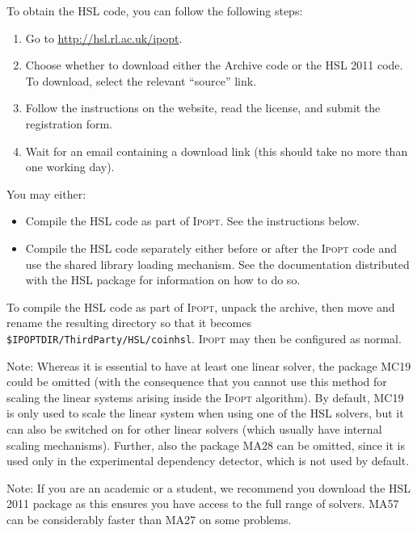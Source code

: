 \documentclass[10pt]{article}
\newcommand{\Ipopt}{\textsc{Ipopt}\xspace}
\begin{document}
To obtain the HSL code, you can follow the following steps:
\begin{enumerate}
\item Go to \url{http://hsl.rl.ac.uk/ipopt}.
\item Choose whether to download either the Archive code or the HSL 2011
   code. To download, select the relevant
   ``source'' link.
\item Follow the instructions on the website, read the license, and
   submit the registration form.
\item Wait for an email containing a download link (this should take no
   more than one working day).
\end{enumerate}

\noindent
You may either:
\begin{itemize}
   \item Compile the HSL code as part of \Ipopt. See the instructions below.
   \item Compile the HSL code separately either before or after the \Ipopt code
      and use the shared library loading mechanism. See the documentation
      distributed with the HSL package for information on how to do so.
\end{itemize}

To compile the HSL code as part of \Ipopt, unpack the archive, then move and
rename the resulting directory so that it becomes
{\tt \$IPOPTDIR/ThirdParty/HSL/coinhsl}. \Ipopt may then be configured as
normal.

Note: Whereas it is essential to have at least one linear solver, the
package MC19 could be omitted (with the consequence that you cannot
use this method for scaling the linear systems arising inside the
\Ipopt algorithm).  By default, MC19 is only used to scale the linear
system when using one of the HSL solvers, but it can also be
switched on for other linear solvers (which usually have internal
scaling mechanisms).
Further, also the package MA28 can be omitted, since it is used only
in the experimental dependency detector, which is not used by default.

Note: If you are an academic or a student, we recommend you download the
HSL 2011 package as this ensures you have access to the full range of solvers.
MA57 can be considerably faster than MA27 on some problems.
\end{document}
